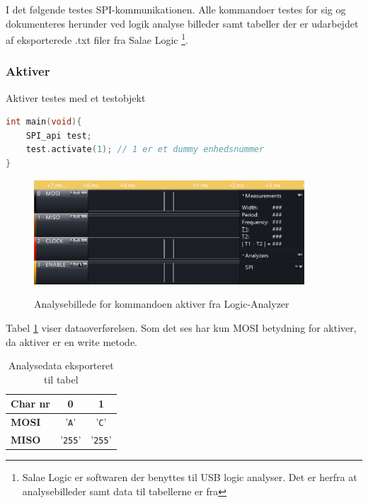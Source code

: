 \label{section:spi_integrationstest}

I det følgende testes SPI-kommunikationen. Alle kommandoer testes for sig og dokumenteres herunder ved logik analyse billeder samt tabeller der er udarbejdet af eksporterede .txt filer fra Salae Logic \footnote{Salae Logic er softwaren der benyttes til USB logic analyser. Det er herfra at analysebilleder samt data til tabellerne er fra}. 


\subsubsection*{Aktiver}

Aktiver testes med et testobjekt

\begin{lstlisting}[language=C]
int main(void){
	SPI_api test;
	test.activate(1); // 1 er et dummy enhedsnummer
}
\end{lstlisting}

\begin{figure}[H]
\centering
{\includegraphics[width=0.90\textwidth]{filer/integrationstest/billeder/spi_activate}}
\caption{Analysebillede for kommandoen aktiver fra Logic-Analyzer}
\label{lab:scop_activate}
\end{figure}

Tabel \ref{table:scop_activate} viser dataoverførelsen. Som det ses har kun MOSI betydning for aktiver, da aktiver er en write metode. 

\begin{table}[H]
	\caption{Analysedata eksporteret til tabel}
	\centering
	\begin{tabular}{|l|c|c|}
		\hline 
		\textbf{Char nr} & \textbf{0} & \textbf{1} \\ 		
		\hline 
		\textbf{MOSI} & '\verb+A+' & '\verb+C+' \\ 
		\hline 
		\textbf{MISO} & '\verb+255+' & '\verb+255+' \\ 
		\hline 
	\end{tabular} 
	\label{table:scop_activate}
\end{table}


